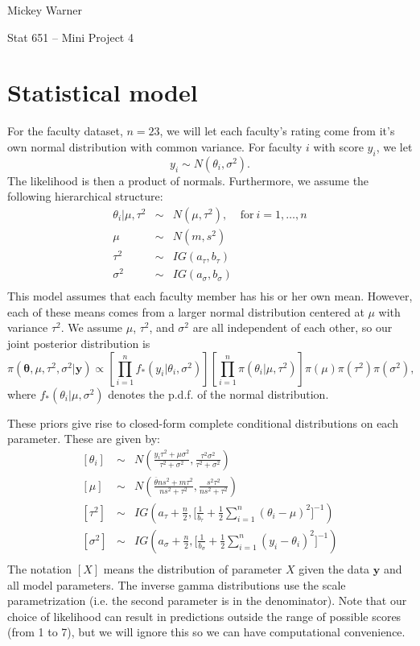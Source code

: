 \documentclass[12pt]{article}
\newcommand{\m}[1]{\mathbf{\bm{#1}}}
\begin{document}
\noindent Mickey Warner

\noindent Stat 651 -- Mini Project 4

\section{Statistical model}

\noindent For the faculty dataset, $n=23$, we will let each faculty's rating come from it's own normal distribution with common variance. For faculty $i$ with score $y_i$, we let
\[ y_i \sim N(\theta_i, \sigma^2). \]
\noindent The likelihood is then a product of normals. Furthermore, we assume the following hierarchical structure:
\begin{eqnarray*}
\theta_i|\mu,\tau^2 &\sim& N(\mu, \tau^2),~~~~~\mathrm{for\ }i=1,\ldots,n \\
\mu &\sim& N(m, s^2) \\
\tau^2 &\sim& IG(a_\tau, b_\tau) \\
\sigma^2 &\sim& IG(a_\sigma, b_\sigma) \\
\end{eqnarray*}
\noindent This model assumes that each faculty member has his or her own mean. However, each of these means comes from a larger normal distribution centered at $\mu$ with variance $\tau^2$. We assume $\mu$, $\tau^2$, and $\sigma^2$ are all independent of each other, so our joint posterior distribution is
\[ \pi(\m{\theta}, \mu, \tau^2, \sigma^2|\m{y}) \propto \left[\prod_{i=1}^nf_*(y_i|\theta_i, \sigma^2)\right] \left[\prod_{i=1}^n\pi(\theta_i|\mu,\tau^2)\right]\pi(\mu)\pi(\tau^2)\pi(\sigma^2), \]
\noindent where $f_*(\theta_i|\mu, \sigma^2)$ denotes the p.d.f. of the normal distribution.
\bigskip

\noindent These priors give rise to closed-form complete conditional distributions on each parameter. These are given by:
\begin{eqnarray*}
\left[\theta_i\right] &\sim& N\left(\frac{y_i\tau^2+\mu\sigma^2}{\tau^2+\sigma^2},\frac{\tau^2\sigma^2}{\tau^2+\sigma^2}\right) \\
\left[\mu\right] &\sim& N\left(\frac{\overline{\theta}ns^2+m\tau^2}{ns^2+\tau^2},\frac{s^2\tau^2}{ns^2+\tau^2}\right) \\
\left[\tau^2\right] &\sim& IG\left(a_\tau+\frac{n}{2}, \Big[\frac{1}{b_\tau}+\frac{1}{2}\sum_{i=1}^n(\theta_i-\mu)^2\Big]^{-1}\right) \\
\left[\sigma^2\right] &\sim& IG\left(a_\sigma+\frac{n}{2}, \Big[\frac{1}{b_\sigma}+\frac{1}{2}\sum_{i=1}^n(y_i-\theta_i)^2\Big]^{-1}\right) \\
\end{eqnarray*}
\noindent The notation $[X]$ means the distribution of parameter $X$ given the data $\m{y}$ and all model parameters. The inverse gamma distributions use the scale parametrization (i.e. the second parameter is in the denominator). Note that our choice of likelihood can result in predictions outside the range of possible scores (from 1 to 7), but we will ignore this so we can have computational convenience.
\end{document}
